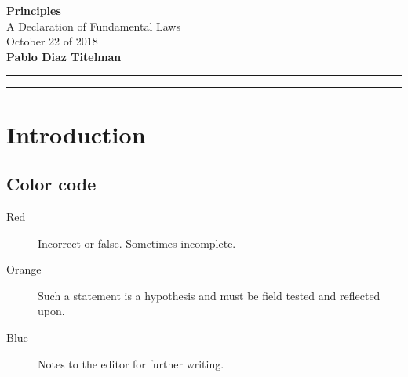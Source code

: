 \documentclass{book}
\begin{document}
\thispagestyle{empty}


\begin{center}
{\Large\bf Principles}\\
\vspace*{2mm}
{\Large A Declaration of Fundamental Laws}\\
{October 22 of 2018}\\
\vspace*{1mm}
{\bf Pablo Diaz Titelman }\\
\vspace*{1mm}
\end{center}
\hrule\vspace*{2pt}\hrule

\tableofcontents
\setcounter{page}{1}
\chapter{Introduction}

\section{Color code}

\begin{description}
\item[{\color{red}Red}] Incorrect or false. Sometimes incomplete.
\item[{\color{orange}Orange}] Such a statement is a hypothesis and must be field tested and reflected upon.
\item[{\color{blue}Blue}] Notes to the editor for further writing.
\end{description}
\end{document}

